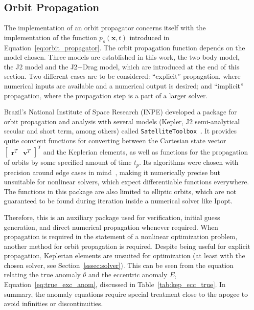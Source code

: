 \subsection{Orbit Propagation}\label{sec:orbit_propagation}

The implementation of an orbit propagator concerns itself with the implementation of the function \(p_o(\mathbf{x}, t)\) introduced in Equation~\eqref{eq:orbit_propagator}. The orbit propagation function depends on the model chosen. Three models are established in this work, the two body model, the J2 model and the J2+Drag model, which are introduced at the end of this section. Two different cases are to be considered: ``explicit'' propagation, where numerical inputs are available and a numerical output is desired; and ``implicit'' propagation, where the propagation step is a part of a larger solver.

Brazil's National Institute of Space Research (INPE) developed a package for orbit propagation and analysis with several models (Kepler, J2 semi-analytical secular and short term, among others) called \texttt{SatelliteToolbox}~\cite{satellitetoolbox}. It provides quite convient functions for converting between the Cartesian state vector \(\begin{bmatrix}
    \mathbf{r}^T & \mathbf{v}^T
\end{bmatrix}^T\) and the Keplerian elements, as well as functions for the propagation of orbits by some specified amount of time \(t_p\). Its algorithms were chosen with precision around edge cases in mind~\cite{rv_to_kepler}, making it numerically precise but unsuitable for nonlinear solvers, which expect differentiable functions everywhere. The functions in this package are also limited to elliptic orbits, which are not guaranteed to be found during iteration inside a numerical solver like Ipopt.

Therefore, this is an auxiliary package used for verification, initial guess generation, and direct numerical propagation whenever required. When propagation is required in the statement of a nonlinear optimization problem, another method for orbit propagation is required. Despite being useful for explicit propagation, Keplerian elements are unsuited for optimization (at least with the chosen solver, see Section~\ref{sssec:solver}). This can be seen from the equation relating the true anomaly \(\theta\) and the eccentric anomaly \(E\), Equation~\eqref{eq:true_exc_anom}, discussed in Table~\ref{tab:kep_ecc_true}. In summary, the anomaly equations require special treatment close to the apogee to avoid infinities or discontinuities.

